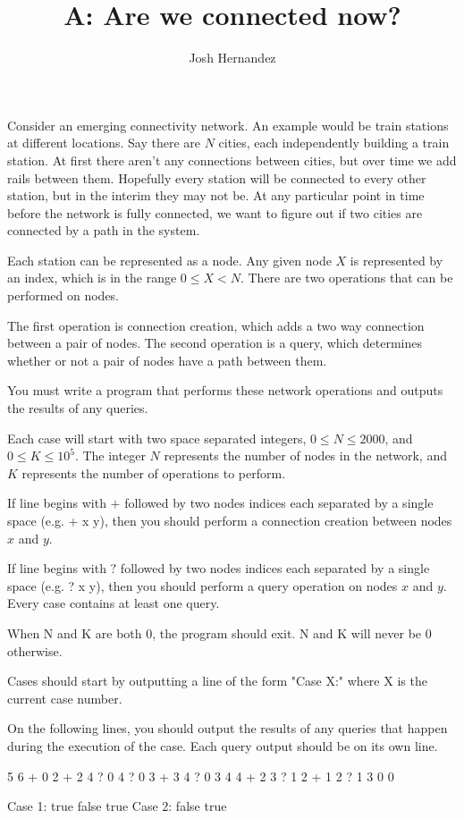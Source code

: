 \documentclass{article}
\title{A: Are we connected now?}
\author{Josh Hernandez}
\begin{document}
\begin{problemDescription}
Consider an emerging connectivity network. An example would be train stations at different locations. Say there are $N$ cities, each independently building a train station. At first there aren't any connections between cities, but over time we add rails between them. Hopefully every station will be connected to every other station, but in the interim they may not be. At any particular point in time before the network is fully connected, we want to figure out if two cities are connected by a path in the system.

Each station can be represented as a node. Any given node $X$ is represented by an index, which is in the range $0 \leq X < N$. There are two operations that can be performed on nodes.

The first operation is connection creation, which adds a two way connection between a pair of nodes. The second operation is a query, which determines whether or not a pair of nodes have a path between them.

You must write a program that performs these network operations and outputs the results of any queries.

\end{problemDescription}

\begin{inputDescription}
Each case will start with two space separated integers, $0 \leq N \leq 2000$, and $0 \leq K \leq 10^5$. The integer $N$ represents the number of nodes in the network, and $K$ represents the number of operations to perform.

If line begins with $+$ followed by two nodes indices each separated by a single space (e.g. + x y), then you should perform a connection creation between nodes $x$ and $y$.

If line begins with $?$ followed by two nodes indices each separated by a single space (e.g. ? x y), then you should perform a query operation on nodes $x$ and $y$. Every case contains at least one query.

When N and K are both 0, the program should exit. N and K will never be 0 otherwise.

\end{inputDescription}

\begin{outputDescription}
Cases should start by outputting a line of the form "Case X:" where X is the current case number.

On the following lines, you should output the results of any queries that happen during the execution of the case. Each query output should be on its own line.

\end{outputDescription}

\begin{sampleInput}

5 6
+ 0 2
+ 2 4
? 0 4
? 0 3
+ 3 4
? 0 3
4 4
+ 2 3
? 1 2
+ 1 2
? 1 3
0 0
\end{sampleInput}
\begin{sampleOutput}

Case 1:
true
false
true
Case 2:
false
true
\end{sampleOutput}
\end{document}

